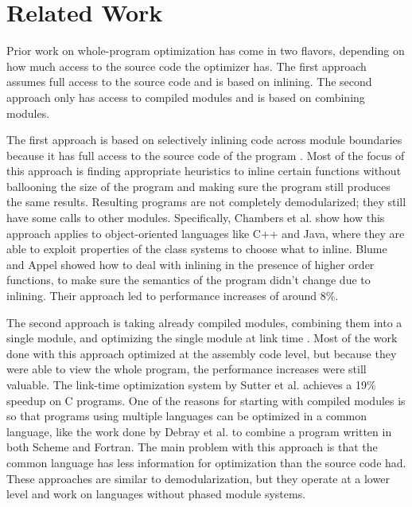 \chapter{Related Work}
\label{chap:related-work}
Prior work on whole-program optimization has come in two flavors, depending on how much access to the source code the optimizer has. The first approach assumes full access to the source code and is based on inlining. The second approach only has access to compiled modules and is based on combining modules.

The first approach is based on selectively inlining code across module boundaries because it has full access to the source code of the program \cite{258960,Chambers96whole-programoptimization}. Most of the focus of this approach is finding appropriate heuristics to inline certain functions without ballooning the size of the program and making sure the program still produces the same results. Resulting programs are not completely demodularized; they still have some calls to other modules. Specifically, Chambers et al. \cite{Chambers96whole-programoptimization} show how this approach applies to object-oriented languages like C++ and Java, where they are able to exploit properties of the class systems to choose what to inline. Blume and Appel \cite{258960} showed how to deal with inlining in the presence of higher order functions, to make sure the semantics of the program didn't change due to inlining. Their approach led to performance increases of around 8\%.

The second approach is taking already compiled modules, combining them into a single module, and optimizing the single module at link time \cite{sutter,727617}. Most of the work done with this approach optimized at the assembly code level, but because they were able to view the whole program, the performance increases were still valuable. 
The link-time optimization system by Sutter et al. \cite{sutter} achieves a 19\% speedup on C programs.
One of the reasons for starting with compiled modules is so that programs using multiple languages can be optimized in a common language, like the work done by Debray et al. \cite{727617} to combine a program written in both Scheme and Fortran. The main problem with this approach is that the common language has less information for optimization than the source code had. 
These approaches are similar to demodularization, but they operate at a lower level and work on languages without phased module systems.

